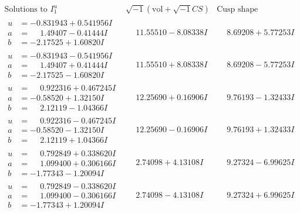 \documentclass[1p]{elsarticle_modified}
\theoremstyle{definition}
\newcommand{\I}{\sqrt{-1}}
\begin{document}
$$\begin{array}{c|c|c}  
\text{Solutions to }I^u_{1}& \I (\text{vol} + \sqrt{-1}CS) & \text{Cusp shape}\\
 \hline 
\begin{aligned}
u &= -0.831943 + 0.541956 I \\
a &= \phantom{-}1.49407 - 0.41444 I \\
b &= -2.17525 + 1.60820 I\end{aligned}
 & \phantom{-}11.55510 - 8.08338 I & \phantom{-}8.69208 + 5.77253 I \\ \hline\begin{aligned}
u &= -0.831943 - 0.541956 I \\
a &= \phantom{-}1.49407 + 0.41444 I \\
b &= -2.17525 - 1.60820 I\end{aligned}
 & \phantom{-}11.55510 + 8.08338 I & \phantom{-}8.69208 - 5.77253 I \\ \hline\begin{aligned}
u &= \phantom{-}0.922316 + 0.467245 I \\
a &= -0.58520 + 1.32150 I \\
b &= \phantom{-}2.12119 - 1.04366 I\end{aligned}
 & \phantom{-}12.25690 + 0.16906 I & \phantom{-}9.76193 - 1.32433 I \\ \hline\begin{aligned}
u &= \phantom{-}0.922316 - 0.467245 I \\
a &= -0.58520 - 1.32150 I \\
b &= \phantom{-}2.12119 + 1.04366 I\end{aligned}
 & \phantom{-}12.25690 - 0.16906 I & \phantom{-}9.76193 + 1.32433 I \\ \hline\begin{aligned}
u &= \phantom{-}0.792849 + 0.338620 I \\
a &= \phantom{-}1.099400 + 0.306166 I \\
b &= -1.77343 - 1.20094 I\end{aligned}
 & \phantom{-}2.74098 + 4.13108 I & \phantom{-}9.27324 - 6.99625 I \\ \hline\begin{aligned}
u &= \phantom{-}0.792849 - 0.338620 I \\
a &= \phantom{-}1.099400 - 0.306166 I \\
b &= -1.77343 + 1.20094 I\end{aligned}
 & \phantom{-}2.74098 - 4.13108 I & \phantom{-}9.27324 + 6.99625 I \\ \hline\begin{aligned}

\end{aligned}
\end{array}$$
\end{document}

